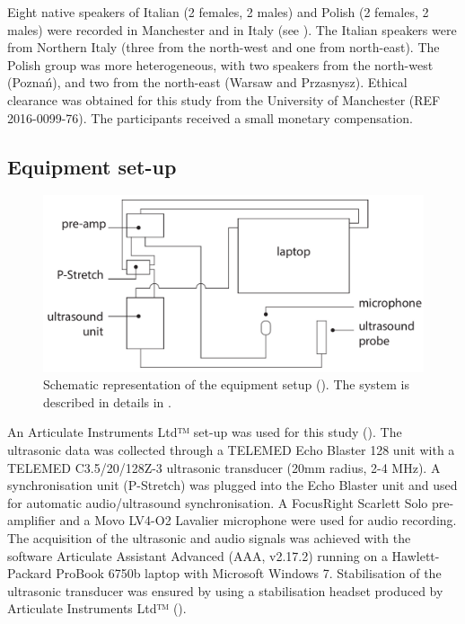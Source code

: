 \documentclass[authoryear, twocolumn]{elsarticle}
\begin{document}
Eight native speakers of Italian (2 females, 2 males) and Polish (2
females, 2 males) were recorded in Manchester and in Italy (see
). The Italian speakers were from Northern Italy
(three from the north-west and one from north-east). The Polish group
was more heterogeneous, with two speakers from the north-west (Poznań),
and two from the north-east (Warsaw and Przasnysz). Ethical clearance
was obtained for this study from the University of Manchester (REF
2016-0099-76). The participants received a small monetary compensation.

\subsection{Equipment set-up}\label{equipment-set-up}

\label{s:equipment}

\begin{figure}
    \centering
    \includegraphics[width=.7\textwidth]{../../graphics/uti-setup.pdf}
    \caption{Schematic representation of the equipment setup (\citealt{articulate2011}). The system is described in details in .}
    \label{f:uti-setup}
\end{figure}

An Articulate Instruments Ltd™ set-up was used for this study
(). The ultrasonic data was collected through a
TELEMED Echo Blaster 128 unit with a TELEMED C3.5/20/128Z-3 ultrasonic
transducer (20mm radius, 2-4 MHz). A synchronisation unit (P-Stretch)
was plugged into the Echo Blaster unit and used for automatic
audio/ultrasound synchronisation. A FocusRight Scarlett Solo
pre-amplifier and a Movo LV4-O2 Lavalier microphone were used for audio
recording. The acquisition of the ultrasonic and audio signals was
achieved with the software Articulate Assistant Advanced (AAA, v2.17.2)
running on a Hawlett-Packard ProBook 6750b laptop with Microsoft Windows
7. Stabilisation of the ultrasonic transducer was ensured by using a
stabilisation headset produced by Articulate Instruments Ltd™
(\citeyear{articulate2008}).
\end{document}
